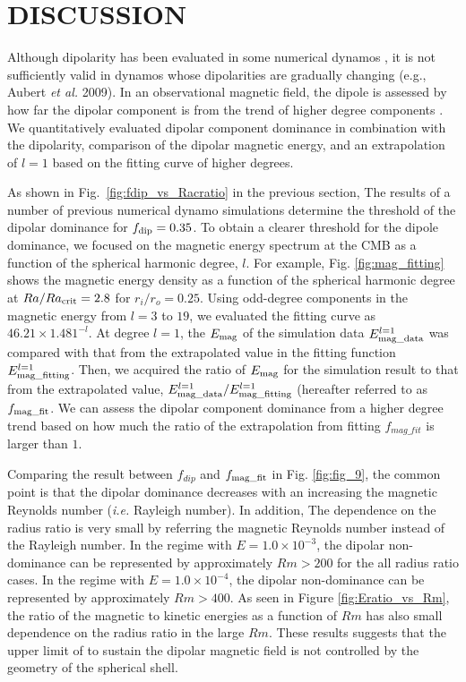 \section{DISCUSSION}

Although dipolarity has been evaluated in some numerical dynamos \cite{Uli:2006,Soderlund:2012}, it is not sufficiently valid in dynamos whose dipolarities are gradually changing (e.g., Aubert {\it et al.} 2009).
In an observational magnetic field, the dipole is assessed by how far the dipolar component is from the trend of higher degree components \cite{Lowes:1974,Langel:1982}. 
We quantitatively evaluated dipolar component dominance in combination with the dipolarity, comparison of the dipolar magnetic energy, and an extrapolation of $l = 1$ based on the fitting curve of higher degrees.


{\color{blue}
As shown in Fig.~\ref{fig:fdip_vs_Racratio} in the previous section, 
}
The results of a number of previous numerical dynamo simulations determine the threshold of the dipolar dominance for $f_{\rm dip} = 0.35$. 
To obtain a clearer threshold for the dipole dominance, we focused on the magnetic energy spectrum at the CMB as a function of the spherical harmonic degree, $l$. 
For example, Fig. \ref{fig:mag_fitting} shows the magnetic energy density as a function of the spherical harmonic degree at $Ra/Ra_{\rm crit} = 2.8$ for $r_i/r_o = 0.25$. 
Using odd-degree components in the magnetic energy from $l = 3$ to $19$, we evaluated the fitting curve as $46.21 \times 1.481^{-l}$. 
At degree $l = 1$, the $E_{\rm mag}$ of the simulation data $E_{\rm mag\_data}^{l = 1}$ was compared with that from the extrapolated value in the fitting function $E_{\rm mag\_fitting}^{l = 1}$. 
Then, we acquired the ratio of $E_{\rm mag}$ for the simulation result to that from the extrapolated value, $E_{\rm mag\_data}^{l = 1}/E_{\rm mag\_fitting}^{l=1}$ (hereafter referred to as $f_{\rm mag\_fit}$. 
We can assess the dipolar component dominance from a higher degree trend based on how much the ratio of the extrapolation from fitting $f_{mag\_fit}$ is larger than $1$.

{\color{blue}
Comparing the result between $f_{dip}$ and $f_{\rm mag\_fit}$ in Fig. \ref{fig:fig_9}, the common point is that the dipolar dominance decreases with an increasing the magnetic Reynolds number ({\it i.e.} Rayleigh number). In addition, The dependence on the radius ratio is very small by referring the magnetic Reynolds number instead of the Rayleigh number.
In the regime with $E = 1.0 \times 10^{-3}$, the dipolar non-dominance can be represented by approximately $Rm > 200$ for the all radius ratio cases. In the regime with $E = 1.0 \times 10^{-4}$, the dipolar non-dominance can be represented by approximately $Rm > 400$. 
As seen in Figure \ref{fig:Eratio_vs_Rm}, the ratio of the magnetic to kinetic energies as a function of $Rm$ has also small dependence on the radius ratio in the large $Rm$. These results suggests that the upper limit of to sustain the dipolar magnetic field is not controlled by the geometry of the spherical shell.
}

